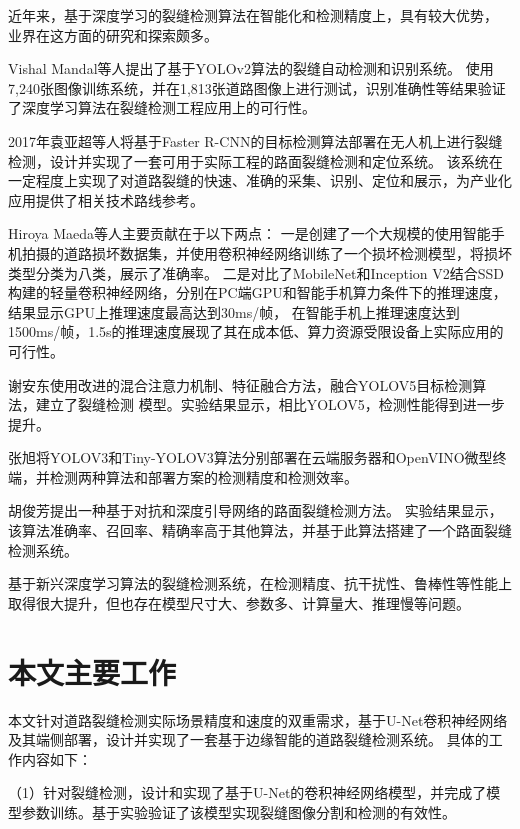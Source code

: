 近年来，基于深度学习的裂缝检测算法在智能化和检测精度上，具有较大优势，
业界在这方面的研究和探索颇多。

Vishal Mandal等人提出了基于YOLOv2算法的裂缝自动检测和识别系统。
使用7,240张图像训练系统，并在1,813张道路图像上进行测试，识别准确性等结果验证了深度学习算法在裂缝检测工程应用上的可行性。

2017年袁亚超等人将基于Faster R-CNN的目标检测算法部署在无人机上进行裂缝检测，设计并实现了一套可用于实际工程的路面裂缝检测和定位系统。
该系统在一定程度上实现了对道路裂缝的快速、准确的采集、识别、定位和展示，为产业化应用提供了相关技术路线参考。

Hiroya Maeda等人主要贡献在于以下两点：
一是创建了一个大规模的使用智能手机拍摄的道路损坏数据集，并使用卷积神经网络训练了一个损坏检测模型，将损坏类型分类为八类，展示了准确率。
二是对比了MobileNet和Inception V2结合SSD构建的轻量卷积神经网络，分别在PC端GPU和智能手机算力条件下的推理速度，结果显示GPU上推理速度最高达到30ms/帧，
在智能手机上推理速度达到1500ms/帧，1.5s的推理速度展现了其在成本低、算力资源受限设备上实际应用的可行性。

谢安东使用改进的混合注意力机制、特征融合方法，融合YOLOV5目标检测算法，建立了裂缝检测
模型。实验结果显示，相比YOLOV5，检测性能得到进一步提升。

张旭将YOLOV3和Tiny-YOLOV3算法分别部署在云端服务器和OpenVINO微型终端，并检测两种算法和部署方案的检测精度和检测效率。

胡俊芳提出一种基于对抗和深度引导网络的路面裂缝检测方法。
实验结果显示，该算法准确率、召回率、精确率高于其他算法，并基于此算法搭建了一个路面裂缝检测系统。

基于新兴深度学习算法的裂缝检测系统，在检测精度、抗干扰性、鲁棒性等性能上取得很大提升，但也存在模型尺寸大、参数多、计算量大、推理慢等问题。


\section{本文主要工作}
本文针对道路裂缝检测实际场景精度和速度的双重需求，基于U-Net卷积神经网络及其端侧部署，设计并实现了一套基于边缘智能的道路裂缝检测系统。
具体的工作内容如下：

（1）针对裂缝检测，设计和实现了基于U-Net的卷积神经网络模型，并完成了模型参数训练。基于实验验证了该模型实现裂缝图像分割和检测的有效性。

